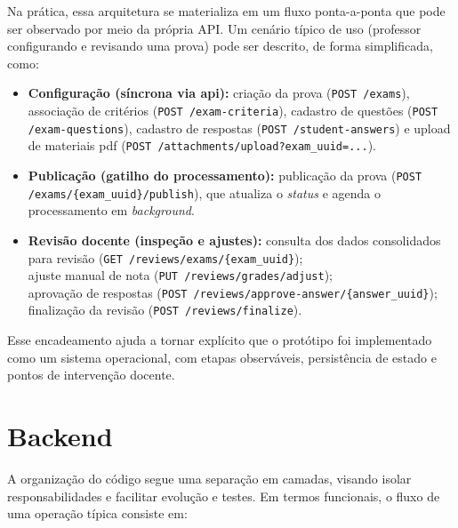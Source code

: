 Na prática, essa arquitetura se materializa em um fluxo ponta-a-ponta que pode ser observado por meio da própria API. Um cenário típico de uso (professor configurando e revisando uma prova) pode ser descrito, de forma simplificada, como:

\begin{itemize}
    \item \textbf{Configuração (síncrona via \gls{api}):} criação da prova (\texttt{POST /exams}), associação de critérios (\texttt{POST /exam-criteria}), cadastro de questões (\texttt{POST /exam-questions}), cadastro de respostas (\texttt{POST /student-answers}) e upload de materiais \gls{pdf} (\texttt{POST \allowbreak /attachments\allowbreak /upload\allowbreak ?exam\_uuid=...}).
    \item \textbf{Publicação (gatilho do processamento):} publicação da prova (\texttt{POST \allowbreak /exams\allowbreak /\{exam\_uuid\}\allowbreak /publish}), que atualiza o \textit{status} e agenda o processamento em \textit{background}.
    \item \textbf{Revisão docente (inspeção e ajustes):} consulta dos dados consolidados para revisão
    (\texttt{GET \allowbreak /reviews\allowbreak /exams\allowbreak /\{\allowbreak exam\_\allowbreak uuid\allowbreak \}});\\
    ajuste manual de nota
    (\texttt{PUT \allowbreak /reviews\allowbreak /grades\allowbreak /adjust});\\
    aprovação de respostas
    (\texttt{POST \allowbreak /reviews\allowbreak /approve-\allowbreak answer\allowbreak /\{\allowbreak answer\_\allowbreak uuid\allowbreak \}});\\
    finalização da revisão
    (\texttt{POST \allowbreak /reviews\allowbreak /finalize}).
\end{itemize}

Esse encadeamento ajuda a tornar explícito que o protótipo foi implementado como um sistema operacional, com etapas observáveis, persistência de estado e pontos de intervenção docente.

\section{Backend}

A organização do código segue uma separação em camadas, visando isolar responsabilidades e facilitar evolução e testes. Em termos funcionais, o fluxo de uma operação típica consiste em:

